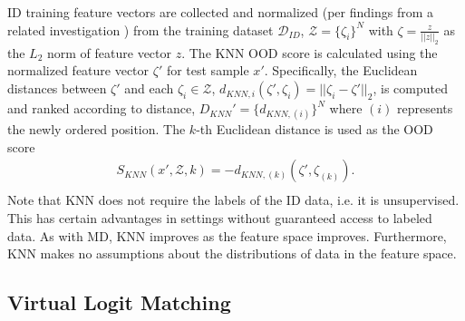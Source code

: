 ID training feature vectors are collected and normalized (per findings from a related investigation \cite{tack2020csi,huang2021importance}) from the training dataset $\mathcal{D}_{ID}$, $\mathcal{Z} = \{\zeta_{i}\}^{N}$ with $\zeta = \frac{z}{\lvert \rvert z \lvert \rvert_{2}}$ as the $L_2$ norm of feature vector $z$. The KNN OOD score is calculated using the normalized feature vector $\zeta'$ for test sample $x'$. Specifically, the Euclidean distances between $\zeta'$ and each $\zeta_i \in \mathcal{Z}$, $d_{KNN,i}(\zeta', \zeta_i) = \lvert \rvert \zeta_{i} - \zeta' \lvert \rvert_{2}$, is computed and ranked according to distance, $D_{KNN}' = \{d_{KNN,(i)}\}^{N}$ where $(i)$ represents the newly ordered position. The $k$-th Euclidean distance is used as the OOD score
\begin{equation}
\begin{aligned}
    S_{KNN}(x',\mathcal{Z},k) = -d_{KNN,(k)}(\zeta', \zeta_{(k)}). \\
\end{aligned}
\end{equation}
Note that KNN does not require the labels of the ID data, i.e. it is unsupervised. This has certain advantages in settings without guaranteed access to labeled data. As with MD, KNN improves as the feature space improves. Furthermore, KNN makes no assumptions about the distributions of data in the feature space.


\subsection{Virtual Logit Matching}

